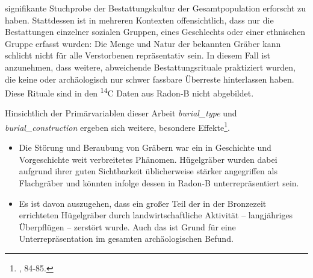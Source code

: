 \documentclass[openany,twoside,twocolumn]{book}
\providecommand{\tightlist}{%
  \setlength{\itemsep}{0pt}\setlength{\parskip}{0pt}}
\let\rmarkdownfootnote\footnote%
\def\footnote{\protect\rmarkdownfootnote}
\begin{document}
\begin{itemize}
  signifikante Stuchprobe der Bestattungskultur der Gesamtpopulation
  erforscht zu haben. Stattdessen ist in mehreren Kontexten
  offensichtlich, dass nur die Bestattungen einzelner sozialen Gruppen,
  eines Geschlechts oder einer ethnischen Gruppe erfasst wurden: Die
  Menge und Natur der bekannten Gräber kann schlicht nicht für alle
  Verstorbenen repräsentativ sein. In diesem Fall ist anzunehmen, dass
  weitere, abweichende Bestattungsrituale praktiziert wurden, die keine
  oder archäologisch nur schwer fassbare Überreste hinterlassen haben.
  Diese Rituale sind in den \textsuperscript{14}C Daten aus Radon-B
  nicht abgebildet.
\end{itemize}

Hinsichtlich der Primärvariablen dieser Arbeit \emph{burial\_type} und
\emph{burial\_construction} ergeben sich weitere, besondere
Effekte\footnote{\textcite{harding_european_2000}, 84-85.}.

\begin{itemize}
\tightlist
\item
  Die Störung und Beraubung von Gräbern war ein in Geschichte und
  Vorgeschichte weit verbreitetes Phänomen. Hügelgräber wurden dabei
  aufgrund ihrer guten Sichtbarkeit üblicherweise stärker angegriffen
  als Flachgräber und könnten infolge dessen in Radon-B
  unterrepräsentiert sein.
\item
  Es ist davon auszugehen, dass ein großer Teil der in der Bronzezeit
  errichteten Hügelgräber durch landwirtschaftliche Aktivität --
  langjähriges Überpflügen -- zerstört wurde. Auch das ist Grund für
  eine Unterrepräsentation im gesamten archäologischen Befund.
\end{itemize}
\end{document}
